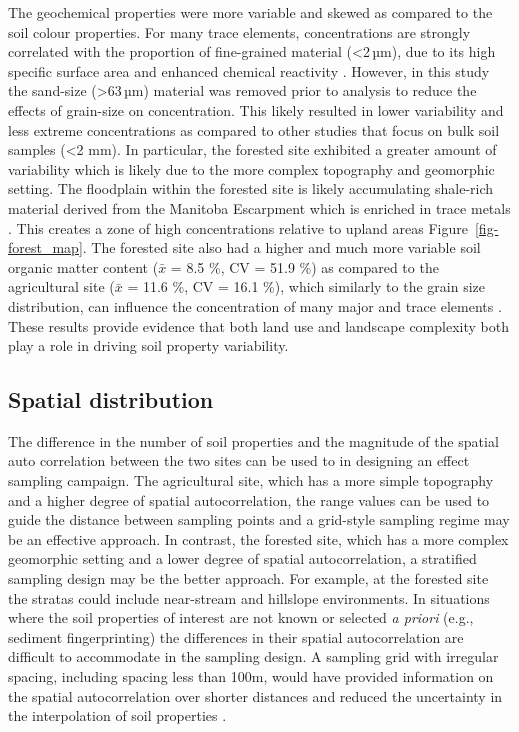 \documentclass[
  number]{elsarticle}
\begin{document}
The geochemical properties were more variable and skewed as compared to
the soil colour properties. For many trace elements, concentrations are
strongly correlated with the proportion of fine-grained material
(\textless2\,µm), due to its high specific surface area and enhanced
chemical reactivity \citep{horowitz1991}. However, in this study the
sand-size (\textgreater63\,µm) material was removed prior to analysis to
reduce the effects of grain-size on concentration. This likely resulted
in lower variability and less extreme concentrations as compared to
other studies that focus on bulk soil samples (\textless2 mm). In
particular, the forested site exhibited a greater amount of variability
which is likely due to the more complex topography and geomorphic
setting. The floodplain within the forested site is likely accumulating
shale-rich material derived from the Manitoba Escarpment which is
enriched in trace metals \citep{nicolas2011}. This creates a zone of
high concentrations relative to upland areas
Figure~\ref{fig-forest_map}. The forested site also had a higher and
much more variable soil organic matter content (\(\bar{x}\) = 8.5 \%, CV
= 51.9 \%) as compared to the agricultural site (\(\bar{x}\) = 11.6 \%,
CV = 16.1 \%), which similarly to the grain size distribution, can
influence the concentration of many major and trace elements
\citep{horowitz1991}. These results provide evidence that both land use
and landscape complexity both play a role in driving soil property
variability.

\subsection{Spatial distribution}\label{spatial-distribution}

The difference in the number of soil properties and the magnitude of the
spatial auto correlation between the two sites can be used to in
designing an effect sampling campaign. The agricultural site, which has
a more simple topography and a higher degree of spatial autocorrelation,
the range values can be used to guide the distance between sampling
points and a grid-style sampling regime may be an effective approach. In
contrast, the forested site, which has a more complex geomorphic setting
and a lower degree of spatial autocorrelation, a stratified sampling
design may be the better approach. For example, at the forested site the
stratas could include near-stream and hillslope environments. In
situations where the soil properties of interest are not known or
selected \emph{a priori} (e.g., sediment fingerprinting) the differences
in their spatial autocorrelation are difficult to accommodate in the
sampling design. A sampling grid with irregular spacing, including
spacing less than 100m, would have provided information on the spatial
autocorrelation over shorter distances and reduced the uncertainty in
the interpolation of soil properties \citep{lark2018}.
\end{document}
